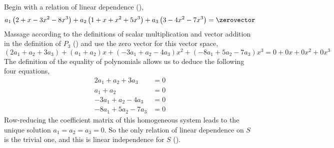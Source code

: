 Begin with a relation of linear dependence (),
%
\begin{equation*}
a_1\left(2 +x -3x^2 -8x^3\right)+a_2\left(1+ x + x^2 +5x^3\right)+a_3\left(3 -4x^2 -7x^3\right)=\zerovector
\end{equation*}
%
Massage according to the definitions of scalar multiplication and vector addition in the definition of $P_3$ () and use the zero vector for this vector space,
%
\begin{equation*}
\left(2a_1+a_2+3a_3\right)+
\left(a_1+a_2\right)x+
\left(-3a_1+a_2-4a_3\right)x^2+
\left(-8a_1+5a_2-7a_3\right)x^3
=0+0x+0x^2+0x^3
\end{equation*}
%
The definition of the equality of polynomials allows us to deduce the following four equations,
%
\begin{align*}
2a_1+a_2+3a_3&=0\\
a_1+a_2&=0\\
-3a_1+a_2-4a_3&=0\\
-8a_1+5a_2-7a_3&=0
\end{align*}
%
Row-reducing the coefficient matrix of this homogeneous system leads to the unique solution $a_1=a_2=a_3=0$.  So the only relation of linear dependence on $S$ is the trivial one, and this is linear independence for $S$ ().
